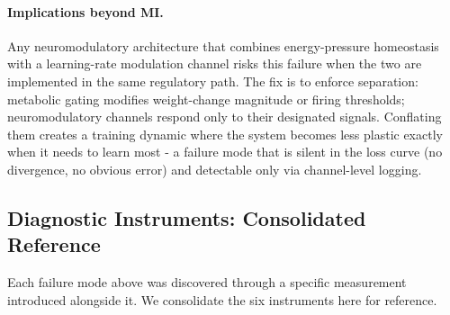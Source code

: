 \paragraph{Implications beyond MI.}
Any neuromodulatory architecture that combines energy-pressure homeostasis with a learning-rate modulation channel risks this failure when the two are implemented in the same regulatory path. The fix is to enforce separation: metabolic gating modifies weight-change magnitude or firing thresholds; neuromodulatory channels respond only to their designated signals. Conflating them creates a training dynamic where the system becomes less plastic exactly when it needs to learn most - a failure mode that is silent in the loss curve (no divergence, no obvious error) and detectable only via channel-level logging.

\subsection{Diagnostic Instruments: Consolidated Reference}
\label{sec:diagnostics}

Each failure mode above was discovered through a specific measurement introduced alongside it. We consolidate the six instruments here for reference.


